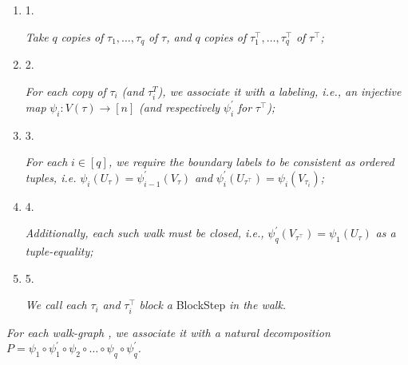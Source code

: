 \begin{enumerate}


\item[] 
1. 


\emph{Take }$q$\emph{ copies of }$\tau_{1},\dots,\tau_{q}$\emph{ of }$\tau$\emph{, and }$q$\emph{ copies of }$\tau_{1}^{\top},\dots,\tau_{q}^{\top}$\emph{ of }$\tau^{\top}$\emph{;}\par





\item[] 
2. 


\emph{For each copy of }$\tau_{i}$\emph{ (and }$\tau_{i}^{T}$\emph{), we associate it with a labeling, i.e., an injective map }$\psi_{i}:V(\tau)\rightarrow[n]$\emph{ (and respectively }$\psi_{i}^{\prime}$\emph{ for }$\tau^{\top}$\emph{);}\par





\item[] 
3. 


\emph{For each }$i\in[q]$\emph{, we require the boundary labels to be consistent as ordered tuples, i.e. }$\psi_{i}(U_{\tau})=\psi^{\prime}_{i-1}(V_{\tau})$\emph{ and }$\psi^{\prime}_{i}(U_{\tau^{\top}})=\psi_{i}(V_{\tau_{i}})$\emph{;}\par





\item[] 
4. 


\emph{Additionally, each such walk must be closed, i.e., }$\psi^{\prime}_{q}(V_{\tau^{\top}})=\psi_{1}(U_{\tau})$\emph{ as a tuple-equality;}\par





\item[] 
5. 


\emph{We call each }$\tau_{i}$\emph{ and }$\tau^{\top}_{i}$\emph{ block a }BlockStep\emph{ in the walk.}\par





\end{enumerate}


\emph{For each walk-graph , we associate it with a natural decomposition $P=\psi_{1}\circ\psi_{1}^{\prime}\circ\psi_{2}\circ\dots\circ\psi_{q}\circ\psi_{q}^{\prime}$.}\par



